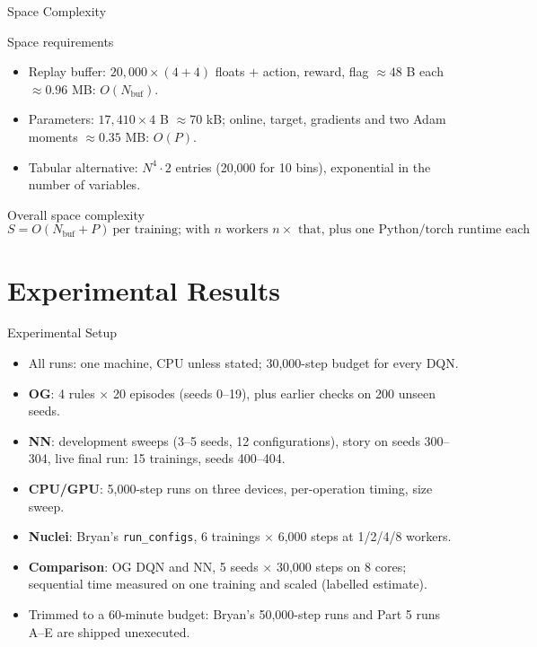 \documentclass[aspectratio=169]{beamer}
\begin{document}
\begin{frame}{Space Complexity}
\begin{block}{Space requirements}
\begin{itemize}
  \item Replay buffer: $20{,}000\times(4+4)$ floats $+$ action, reward, flag $\approx48$ B each $\approx 0.96$ MB: $O(N_{\text{buf}})$.
  \item Parameters: $17{,}410\times4$ B $\approx70$ kB; online, target, gradients and two Adam moments $\approx0.35$ MB: $O(P)$.
  \item Tabular alternative: $N^{4}\cdot 2$ entries (20,000 for 10 bins), exponential in the number of variables.
\end{itemize}
\end{block}

\begin{block}{Overall space complexity}
\[
S=O(N_{\text{buf}}+P)\ \text{per training; with } n \text{ workers } n\times\text{ that, plus one Python/torch runtime each}
\]
\end{block}
\end{frame}

\section{Experimental Results}

\begin{frame}{Experimental Setup}
\begin{itemize}
  \item All runs: one machine, CPU unless stated; 30,000-step budget for every DQN.
  \item \textbf{OG}: 4 rules $\times$ 20 episodes (seeds 0--19), plus earlier checks on 200 unseen seeds.
  \item \textbf{NN}: development sweeps (3--5 seeds, 12 configurations), story on seeds 300--304, \alert{live final run: 15 trainings, seeds 400--404}.
  \item \textbf{CPU/GPU}: 5,000-step runs on three devices, per-operation timing, size sweep.
  \item \textbf{Nuclei}: Bryan's \texttt{run\_configs}, 6 trainings $\times$ 6,000 steps at 1/2/4/8 workers.
  \item \textbf{Comparison}: OG DQN and NN, 5 seeds $\times$ 30,000 steps on 8 cores; sequential time measured on one training and scaled (labelled estimate).
  \item \alert{Trimmed to a 60-minute budget}: Bryan's 50,000-step runs and Part 5 runs A--E are shipped unexecuted.
\end{itemize}
\end{frame}
\end{document}
